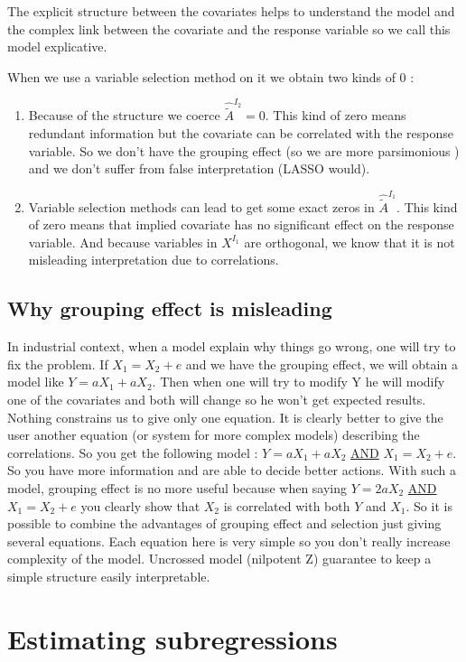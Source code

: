 \documentclass[11pt,a4paper]{article}
\begin{document}
			The explicit structure between the covariates helps to understand the model and the complex link between the covariate and the response variable so we call this model explicative.
			
			When we use a variable selection method on it we obtain two kinds of 0 :
			\begin{enumerate}
			\item Because of the structure we coerce $\hat{\tilde{A}}^{I_2} = 0 $. This kind of zero means redundant information but the covariate can be correlated with the response variable. So we don't have the grouping effect (so we are more parsimonious ) and we don't suffer from false interpretation (LASSO would).
			\item Variable selection methods can lead to get some exact zeros in $\hat{\tilde{A}}^{I_1}$. This kind of zero means that implied covariate has no significant effect on the response variable. And because variables in $X^{I_1}$ are orthogonal, we know that it is not misleading interpretation due to correlations.
			\end{enumerate}		
				 
			
		\subsection{Why grouping effect is misleading}		
			
			
			In industrial context, when a model explain why things go wrong, one will try to fix the problem.
			If $X_1=X_2+e$ and we have the grouping effect, we will obtain a model like $Y=aX_1+aX_2$. Then when one will try to modify Y he will modify one of the covariates and both will change so he won't get expected results. Nothing constrains us to give only one equation. It is clearly better to give the user another equation (or system for more complex models) describing the correlations. So you get the following model : $Y=aX_1+aX_2$ \underline{AND} $X_1=X_2+e$. So you have more information and are able to decide better actions. With such a model, grouping effect is no more useful because when saying $Y=2aX_2$ \underline{AND} $X_1=X_2+e$ you clearly show that $X_2$ is correlated with both $Y$ and $X_1$. So it is possible to combine the advantages of grouping effect and selection just giving several equations. Each equation here is very simple so you don't really increase complexity of the model. Uncrossed model (nilpotent Z) guarantee to keep a simple structure easily interpretable.
			
\section{Estimating subregressions}	
\end{document}
